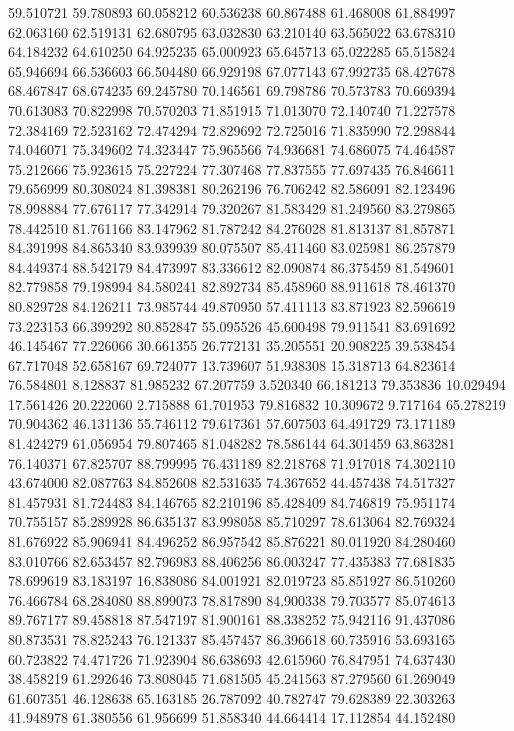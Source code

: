 59.510721
59.780893
60.058212
60.536238
60.867488
61.468008
61.884997
62.063160
62.519131
62.680795
63.032830
63.210140
63.565022
63.678310
64.184232
64.610250
64.925235
65.000923
65.645713
65.022285
65.515824
65.946694
66.536603
66.504480
66.929198
67.077143
67.992735
68.427678
68.467847
68.674235
69.245780
70.146561
69.798786
70.573783
70.669394
70.613083
70.822998
70.570203
71.851915
71.013070
72.140740
71.227578
72.384169
72.523162
72.474294
72.829692
72.725016
71.835990
72.298844
74.046071
75.349602
74.323447
75.965566
74.936681
74.686075
74.464587
75.212666
75.923615
75.227224
77.307468
77.837555
77.697435
76.846611
79.656999
80.308024
81.398381
80.262196
76.706242
82.586091
82.123496
78.998884
77.676117
77.342914
79.320267
81.583429
81.249560
83.279865
78.442510
81.761166
83.147962
81.787242
84.276028
81.813137
81.857871
84.391998
84.865340
83.939939
80.075507
85.411460
83.025981
86.257879
84.449374
88.542179
84.473997
83.336612
82.090874
86.375459
81.549601
82.779858
79.198994
84.580241
82.892734
85.458960
88.911618
78.461370
80.829728
84.126211
73.985744
49.870950
57.411113
83.871923
82.596619
73.223153
66.399292
80.852847
55.095526
45.600498
79.911541
83.691692
46.145467
77.226066
30.661355
26.772131
35.205551
20.908225
39.538454
67.717048
52.658167
69.724077
13.739607
51.938308
15.318713
64.823614
76.584801
8.128837
81.985232
67.207759
3.520340
66.181213
79.353836
10.029494
17.561426
20.222060
2.715888
61.701953
79.816832
10.309672
9.717164
65.278219
70.904362
46.131136
55.746112
79.617361
57.607503
64.491729
73.171189
81.424279
61.056954
79.807465
81.048282
78.586144
64.301459
63.863281
76.140371
67.825707
88.799995
76.431189
82.218768
71.917018
74.302110
43.674000
82.087763
84.852608
82.531635
74.367652
44.457438
74.517327
81.457931
81.724483
84.146765
82.210196
85.428409
84.746819
75.951174
70.755157
85.289928
86.635137
83.998058
85.710297
78.613064
82.769324
81.676922
85.906941
84.496252
86.957542
85.876221
80.011920
84.280460
83.010766
82.653457
82.796983
88.406256
86.003247
77.435383
77.681835
78.699619
83.183197
16.838086
84.001921
82.019723
85.851927
86.510260
76.466784
68.284080
88.899073
78.817890
84.900338
79.703577
85.074613
89.767177
89.458818
87.547197
81.900161
88.338252
75.942116
91.437086
80.873531
78.825243
76.121337
85.457457
86.396618
60.735916
53.693165
60.723822
74.471726
71.923904
86.638693
42.615960
76.847951
74.637430
38.458219
61.292646
73.808045
71.681505
45.241563
87.279560
61.269049
61.607351
46.128638
65.163185
26.787092
40.782747
79.628389
22.303263
41.948978
61.380556
61.956699
51.858340
44.664414
17.112854
44.152480
